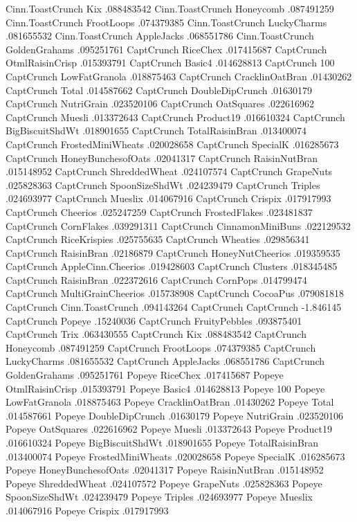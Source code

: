 Cinn.ToastCrunch	Kix	.088483542
Cinn.ToastCrunch	Honeycomb	.087491259
Cinn.ToastCrunch	FrootLoops	.074379385
Cinn.ToastCrunch	LuckyCharms	.081655532
Cinn.ToastCrunch	AppleJacks	.068551786
Cinn.ToastCrunch	GoldenGrahams	.095251761
CaptCrunch	RiceChex	.017415687
CaptCrunch	OtmlRaisinCrisp	.015393791
CaptCrunch	Basic4	.014628813
CaptCrunch	100%
CaptCrunch	LowFatGranola	.018875463
CaptCrunch	CracklinOatBran	.01430262
CaptCrunch	Total	.014587662
CaptCrunch	DoubleDipCrunch	.01630179
CaptCrunch	NutriGrain	.023520106
CaptCrunch	OatSquares	.022616962
CaptCrunch	Muesli	.013372643
CaptCrunch	Product19	.016610324
CaptCrunch	BigBiscuitShdWt	.018901655
CaptCrunch	TotalRaisinBran	.013400074
CaptCrunch	FrostedMiniWheats	.020028658
CaptCrunch	SpecialK	.016285673
CaptCrunch	HoneyBunchesofOats	.02041317
CaptCrunch	RaisinNutBran	.015148952
CaptCrunch	ShreddedWheat	.024107574
CaptCrunch	GrapeNuts	.025828363
CaptCrunch	SpoonSizeShdWt	.024239479
CaptCrunch	Triples	.024693977
CaptCrunch	Mueslix	.014067916
CaptCrunch	Crispix	.017917993
CaptCrunch	Cheerios	.025247259
CaptCrunch	FrostedFlakes	.023481837
CaptCrunch	CornFlakes	.039291311
CaptCrunch	CinnamonMiniBuns	.022129532
CaptCrunch	RiceKrispies	.025755635
CaptCrunch	Wheaties	.029856341
CaptCrunch	RaisinBran	.02186879
CaptCrunch	HoneyNutCheerios	.019359535
CaptCrunch	AppleCinn.Cheerios	.019428603
CaptCrunch	Clusters	.018345485
CaptCrunch	RaisinBran	.022372616
CaptCrunch	CornPops	.014799474
CaptCrunch	MultiGrainCheerios	.015738908
CaptCrunch	CocoaPus	.079081818
CaptCrunch	Cinn.ToastCrunch	.094143264
CaptCrunch	CaptCrunch	-1.846145
CaptCrunch	Popeye	.15240036
CaptCrunch	FruityPebbles	.093875401
CaptCrunch	Trix	.063430555
CaptCrunch	Kix	.088483542
CaptCrunch	Honeycomb	.087491259
CaptCrunch	FrootLoops	.074379385
CaptCrunch	LuckyCharms	.081655532
CaptCrunch	AppleJacks	.068551786
CaptCrunch	GoldenGrahams	.095251761
Popeye	RiceChex	.017415687
Popeye	OtmlRaisinCrisp	.015393791
Popeye	Basic4	.014628813
Popeye	100%
Popeye	LowFatGranola	.018875463
Popeye	CracklinOatBran	.01430262
Popeye	Total	.014587661
Popeye	DoubleDipCrunch	.01630179
Popeye	NutriGrain	.023520106
Popeye	OatSquares	.022616962
Popeye	Muesli	.013372643
Popeye	Product19	.016610324
Popeye	BigBiscuitShdWt	.018901655
Popeye	TotalRaisinBran	.013400074
Popeye	FrostedMiniWheats	.020028658
Popeye	SpecialK	.016285673
Popeye	HoneyBunchesofOats	.02041317
Popeye	RaisinNutBran	.015148952
Popeye	ShreddedWheat	.024107572
Popeye	GrapeNuts	.025828363
Popeye	SpoonSizeShdWt	.024239479
Popeye	Triples	.024693977
Popeye	Mueslix	.014067916
Popeye	Crispix	.017917993
